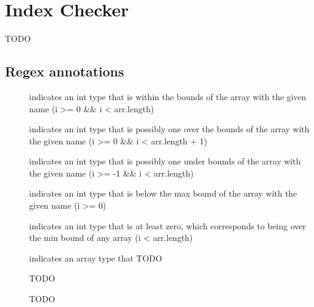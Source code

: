 \chapter{Index Checker\label{index-checker}}
TODO

\section{Regex annotations\label{regex-annotations}}

\begin{description}
\item[]
	indicates an int type that is within the bounds of the array with the given name (i >= 0 \&\& i < arr.length)
\item[]
	indicates an int type that is possibly one over the bounds of the array with the given name (i >= 0 \&\& i < arr.length + 1)
\item[]
	indicates an int type that is possibly one under bounds of the array with the given name (i >= -1 \&\& i < arr.length)
\item[]
	indicates an int type that is below the max bound of the array with the given name (i >= 0)
\item[]
	indicates an int type that is at least zero, which corresponds to being over the min bound of any array (i < arr.length)
\item[]
	indicates an array type that TODO
\end{description}

\begin{figure}
\caption{TODO}
\label{fig-index-figure}
\end{figure}

\begin{figure}
\caption{TODO}
\label{fig-index-heirarchy}
\end{figure}